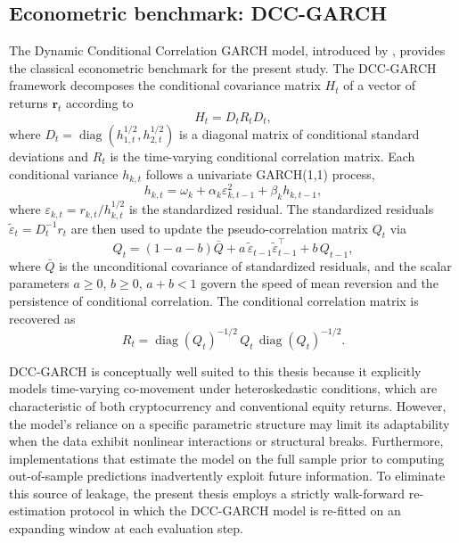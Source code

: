 \subsection{Econometric benchmark: DCC-GARCH}

The Dynamic Conditional Correlation GARCH model, introduced by \textcite{engle2002}, provides the classical econometric benchmark for the present study. The DCC-GARCH framework decomposes the conditional covariance matrix $H_t$ of a vector of returns $\mathbf{r}_t$ according to
\begin{equation}
    H_t = D_t R_t D_t,
\end{equation}
where $D_t = \operatorname{diag}(h_{1,t}^{1/2}, h_{2,t}^{1/2})$ is a diagonal matrix of conditional standard deviations and $R_t$ is the time-varying conditional correlation matrix. Each conditional variance $h_{k,t}$ follows a univariate GARCH(1,1) process,
\begin{equation}
    h_{k,t} = \omega_k + \alpha_k \varepsilon_{k,t-1}^{2} + \beta_k h_{k,t-1},
\end{equation}
where $\varepsilon_{k,t} = r_{k,t}/h_{k,t}^{1/2}$ is the standardized residual. The standardized residuals $\tilde{\varepsilon}_t = D_t^{-1} r_t$ are then used to update the pseudo-correlation matrix $Q_t$ via
\begin{equation}
    Q_t = (1 - a - b)\bar{Q} + a\,\tilde{\varepsilon}_{t-1}\tilde{\varepsilon}_{t-1}^{\top} + b\, Q_{t-1},
\end{equation}
where $\bar{Q}$ is the unconditional covariance of standardized residuals, and the scalar parameters $a \geq 0$, $b \geq 0$, $a + b < 1$ govern the speed of mean reversion and the persistence of conditional correlation. The conditional correlation matrix is recovered as
\begin{equation}
    R_t = \operatorname{diag}(Q_t)^{-1/2}\, Q_t\, \operatorname{diag}(Q_t)^{-1/2}.
\end{equation}

DCC-GARCH is conceptually well suited to this thesis because it explicitly models time-varying co-movement under heteroskedastic conditions, which are characteristic of both cryptocurrency and conventional equity returns. However, the model's reliance on a specific parametric structure may limit its adaptability when the data exhibit nonlinear interactions or structural breaks. Furthermore, implementations that estimate the model on the full sample prior to computing out-of-sample predictions inadvertently exploit future information. To eliminate this source of leakage, the present thesis employs a strictly walk-forward re-estimation protocol in which the DCC-GARCH model is re-fitted on an expanding window at each evaluation step.

